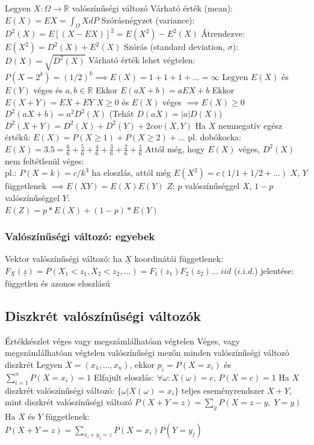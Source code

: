 \documentclass[12pt,a4paper]{article}
\begin{document}
\begin{outline}
	\1 Legyen $X:\Omega \to \mathbb{R}$ valószínűségi változó
	\1 Várható érték (mean): $E(X)=EX=\int_\Omega XdP$
	\1 Szórásnégyzet (variance): $D^2(X) = E[(X-EX)]^2=E(X^2)-E^2(X)$
		\2 Átrendezve: $E(X^2) = D^2(X) + E^2(X)$
	\1 Szórás (standard deviation, $\sigma$): $D(X)=\sqrt{D^2(X)}$
	\1 Várható érték lehet végtelen:\\
	$P(X=2^k)=(1/2)^k \implies E(X)=1+1+1+...=\infty$
	\1 Legyen $E(X)$ és $E(Y)$ véges és $a,b \in \mathbb{R}$
		\2 Ekkor $E(aX+b) = aEX+b$
		\2 Ekkor $E(X+Y) = EX+EY$
	\1 $X \ge 0$ és $E(X)$ véges $\implies E(X) \ge 0$
	\1 $D^2(aX+b) = a^2D^2(X)$ \;\; (Tehát $D(aX) = |a|D(X)$)
	\1 $D^2(X+Y) = D^2(X)+D^2(Y)+2cov(X,Y)$
	\1 Ha $X$ nemnegatív egész értékű: $E(X) = P(X\ge1) + P(X\ge2) + ...$
		\2 pl. dobókocka: $E(X)=3.5=\frac{6}{6}+\frac{5}{6}+\frac{4}{6}+\frac{3}{6}+\frac{2}{6}+\frac{1}{6}$
	\1 Attól még, hogy $E(X)$ véges, $D^2(X)$ nem feltétlenül véges:\\
	pl.: $P(X=k)=c/k^3$ ha eloszlás, attól még $E(X^2)=c(1/1+1/2+...)$
	\1 $X$, $Y$ függetlenek $\implies E(XY)=E(X)E(Y)$
	\1 $Z$: $p$ valószínűséggel $X$, $1-p$ valószínűséggel $Y$:\\
	$E(Z) = p*E(X) + (1-p)*E(Y)$
\end{outline}

\subsubsection{Valószínűségi változó: egyebek}

\begin{outline}
	\1 Vektor valószínűségi változó: ha $\underline{X}$ koordinátái függetlenek:\\
	$F_{\underline{X}}(\underline{z}) = P(X_1 < z_1, X_2 < z_2, ...) = F_1(z_1)F_2(z_2)...$
	\1 $iid$ ($i.i.d.$) jelentése: független és azonos eloszlású
\end{outline}

\pagebreak

\subsection{Diszkrét valószínűségi változók}

\begin{outline}
	\1 Értékkészlet véges vagy megszámlálhatóan végtelen
		\2 Véges, vagy megszámlálhatóan végtelen valószínűségi mezőn minden valószínűségi változó diszkrét
	\1 Legyen $X=(x_1,...,x_n)$, ekkor $p_i = P(X = x_i)$ és $\sum_{i=1}^{n} P(X=x_i) = 1$
	\1 Elfajult eloszlás: $\forall \omega: X(\omega) = c$,\; $P(X=c)=1$
	\1 Ha $X$ diszkrét valószínűségi változó: $\{\omega | X(\omega)=x_i\}$ teljes eseményrendszer
	\1 $X+Y$, mint diszkrét valószínűségi változó
		\2 $P(X+Y=z)=\sum_y P(X=z-y,\; Y=y)$
		\2 Ha $X$ és $Y$ függetlenek:\\
		$P(X+Y=z) = \sum_{x_i+y_j=z} P(X=x_i)P(Y=y_j)$
\end{outline}
\end{document}
